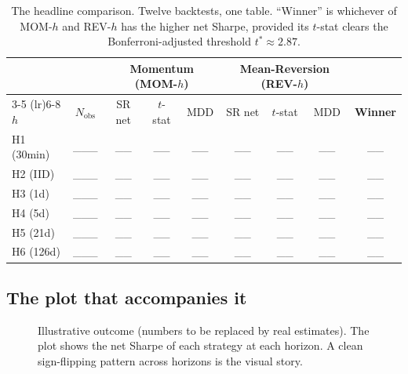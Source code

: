 \documentclass[11pt,letterpaper]{article}
\begin{document}
\begin{table}[H]
\centering
\small
\renewcommand{\arraystretch}{1.3}
\begin{tabular}{@{}l c c c c c c c c@{}}
\toprule
 & & \multicolumn{3}{c}{\textbf{Momentum (MOM-$h$)}} & \multicolumn{3}{c}{\textbf{Mean-Reversion (REV-$h$)}} & \\
\cmidrule(lr){3-5} \cmidrule(lr){6-8}
\textbf{$h$} & \textbf{$N_{\text{obs}}$} & SR net & $t$-stat & MDD & SR net & $t$-stat & MDD & \textbf{Winner}\\
\midrule
H1 (30min)  & \_\_\_ & \_\_ & \_\_ & \_\_ & \_\_ & \_\_ & \_\_ & \_\_\\
H2 (IID)    & \_\_\_ & \_\_ & \_\_ & \_\_ & \_\_ & \_\_ & \_\_ & \_\_\\
H3 (1d)     & \_\_\_ & \_\_ & \_\_ & \_\_ & \_\_ & \_\_ & \_\_ & \_\_\\
H4 (5d)     & \_\_\_ & \_\_ & \_\_ & \_\_ & \_\_ & \_\_ & \_\_ & \_\_\\
H5 (21d)    & \_\_\_ & \_\_ & \_\_ & \_\_ & \_\_ & \_\_ & \_\_ & \_\_\\
H6 (126d)   & \_\_\_ & \_\_ & \_\_ & \_\_ & \_\_ & \_\_ & \_\_ & \_\_\\
\bottomrule
\end{tabular}
\caption{The headline comparison. Twelve backtests, one table. ``Winner'' is whichever of MOM-$h$ and REV-$h$ has the higher net Sharpe, provided its $t$-stat clears the Bonferroni-adjusted threshold $t^* \approx 2.87$.}
\label{tab:headline}
\end{table}

\subsection{The plot that accompanies it}

\begin{figure}[H]
\centering
{}
\caption{Illustrative outcome (numbers to be replaced by real estimates). The plot shows the net Sharpe of each strategy at each horizon. A clean sign-flipping pattern across horizons is the visual story.}
\label{fig:headline}
\end{figure}
\end{document}
